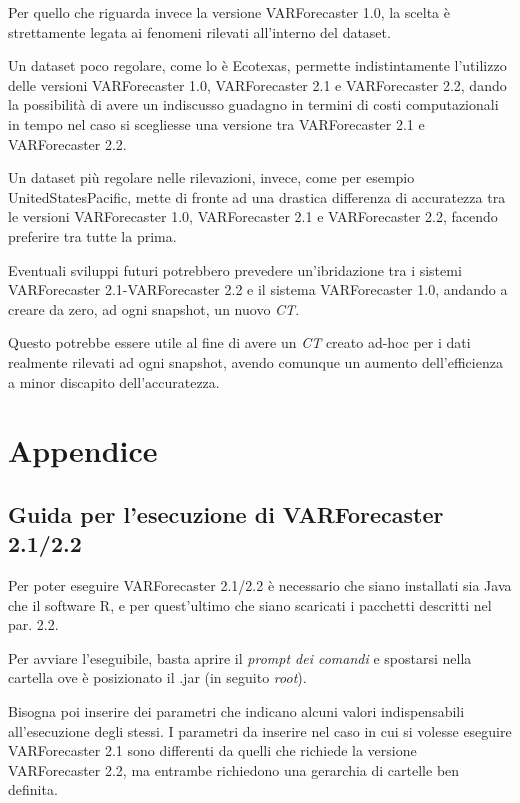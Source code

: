 \documentclass[12pt,a4paper,oneside,openright]{book}
\begin{document}
Per quello che riguarda invece la versione VARForecaster 1.0, la scelta è strettamente legata ai fenomeni rilevati all'interno del dataset. 

Un dataset poco regolare, come lo è Ecotexas, permette indistintamente l'utilizzo delle versioni VARForecaster 1.0, VARForecaster 2.1 e VARForecaster 2.2, dando la possibilità di avere un indiscusso guadagno in termini di costi computazionali in tempo nel caso si scegliesse una versione tra VARForecaster 2.1 e VARForecaster 2.2. 

Un dataset più regolare nelle rilevazioni, invece, come per esempio UnitedStatesPacific, mette di fronte ad una drastica differenza di accuratezza tra le versioni VARForecaster 1.0, VARForecaster 2.1 e VARForecaster 2.2, facendo preferire tra tutte la prima. 

\medskip

Eventuali sviluppi futuri potrebbero prevedere un'ibridazione tra i sistemi VARForecaster 2.1-VARForecaster 2.2 e il sistema VARForecaster 1.0, andando a creare da zero, ad ogni snapshot, un nuovo \textit{CT}.

Questo potrebbe essere utile al fine di avere un \textit{CT} creato ad-hoc per i dati realmente rilevati ad ogni snapshot, avendo comunque un aumento dell'efficienza a minor discapito dell'accuratezza. 
\chapter{Appendice}
\section{Guida per l’esecuzione di VARForecaster 2.1/2.2}

Per poter eseguire VARForecaster 2.1/2.2 è necessario che siano installati sia Java che il software R, e per quest'ultimo che siano scaricati i pacchetti descritti nel par. 2.2.

Per avviare l'eseguibile, basta aprire il \textit{prompt dei comandi} e spostarsi nella cartella ove è posizionato il .jar (in seguito \textit{root}).

Bisogna poi inserire dei parametri che indicano alcuni valori indispensabili all'esecuzione degli stessi. I parametri da inserire nel caso in cui si volesse eseguire VARForecaster 2.1 sono differenti da quelli che richiede la versione VARForecaster 2.2, ma entrambe richiedono una gerarchia di cartelle ben definita. 
\end{document}
